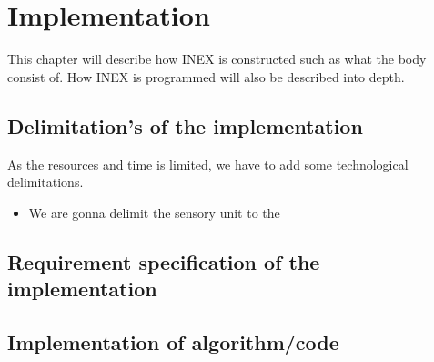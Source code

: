 \chapter{Implementation}
This chapter will describe how INEX is constructed such as what the body consist of. How INEX is programmed will also be described into depth.

\section{Delimitation's of the implementation}
As the resources and time is limited, we have to add some technological delimitations.
\begin{itemize}
    \item We are gonna delimit the sensory unit to the 
\end{itemize}


\section{Requirement specification of the implementation}



\section{Implementation of algorithm/code}



